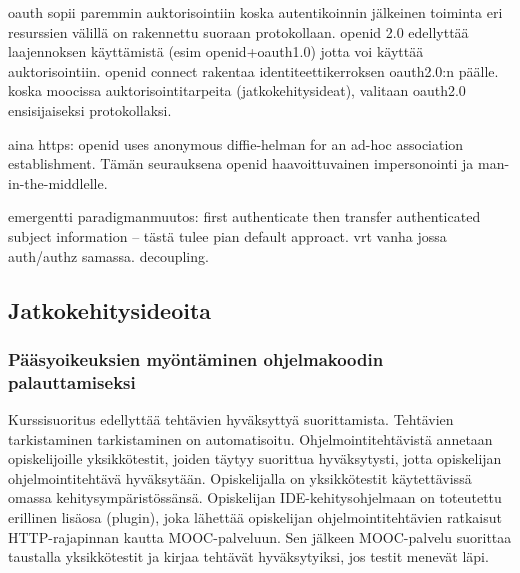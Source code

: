 \documentclass[finnish,gradu]{tktltiki}
\begin{document}
  oauth sopii paremmin auktorisointiin koska autentikoinnin jälkeinen toiminta eri resurssien välillä on rakennettu suoraan protokollaan. openid 2.0 edellyttää laajennoksen käyttämistä (esim openid+oauth1.0) jotta voi käyttää auktorisointiin. openid connect rakentaa identiteettikerroksen oauth2.0:n päälle. koska moocissa auktorisointitarpeita (jatkokehitysideat), valitaan oauth2.0 ensisijaiseksi protokollaksi.

  aina https: openid uses anonymous diffie-helman for an ad-hoc association establishment. Tämän seurauksena openid haavoittuvainen impersonointi ja man-in-the-middlelle.

  emergentti paradigmanmuutos: first authenticate then transfer authenticated subject information -- tästä tulee pian default approact. vrt vanha jossa auth/authz samassa. decoupling.




  \subsection{Jatkokehitysideoita} %
  \label{sub:jatkokehitysideoita}

  \subsubsection{Pääsyoikeuksien myöntäminen ohjelmakoodin palauttamiseksi} %
  \label{ssub:pääsyoikeuksien_myöntäminen_ohjelmakoodin_palauttamiseksi}

  Kurssisuoritus edellyttää tehtävien hyväksyttyä suorittamista. Tehtävien tarkistaminen tarkistaminen on automatisoitu. Ohjelmointitehtävistä annetaan opiskelijoille yksikkötestit, joiden täytyy suorittua hyväksytysti, jotta opiskelijan ohjelmointitehtävä hyväksytään. Opiskelijalla on yksikkötestit käytettävissä omassa kehitysympäristössänsä. Opiskelijan IDE-kehitysohjelmaan on toteutettu erillinen lisäosa (plugin), joka lähettää opiskelijan ohjelmointitehtävien ratkaisut HTTP-rajapinnan kautta MOOC-palveluun. Sen jälkeen MOOC-palvelu suorittaa taustalla yksikkötestit ja kirjaa tehtävät hyväksytyiksi, jos testit menevät läpi.
\end{document}
